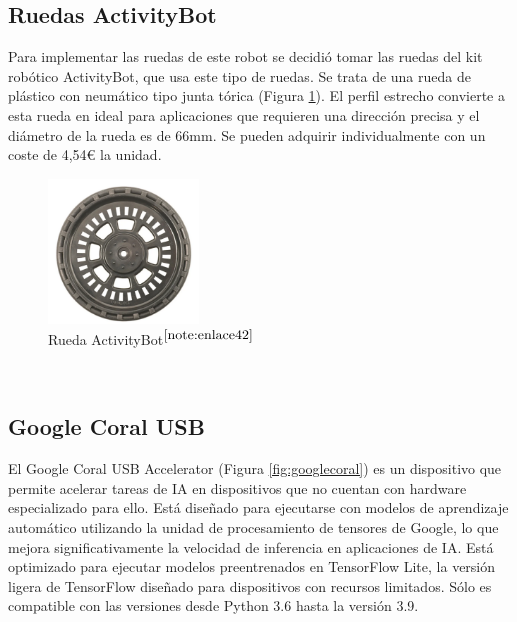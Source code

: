 \setcounter{footnote}{41} %



\subsection{Ruedas ActivityBot}

Para implementar las ruedas de este robot se decidió tomar las ruedas del kit robótico ActivityBot, que usa este tipo de ruedas. Se trata de una rueda de plástico con neumático tipo junta tórica (Figura \ref{fig:wheel}). El perfil estrecho convierte a esta rueda en ideal para aplicaciones que requieren una dirección precisa y el diámetro de la rueda es de 66mm. Se pueden adquirir individualmente con un coste de 4,54€ la unidad.

\begin{figure} [h!]
	\begin{center}
		\includegraphics[width=4cm]{figs/wheel.png}
	\end{center}
	\caption{Rueda ActivityBot$^{\ref{note:enlace42}}$} 
\label{fig:wheel}
\end{figure}\

\setcounter{footnote}{42} %

\subsection{Google Coral USB}

El Google Coral USB Accelerator (Figura \ref{fig:googlecoral}) es un dispositivo que permite acelerar tareas de \ac{IA} en dispositivos que no cuentan con hardware especializado para ello. Está diseñado para ejecutarse con modelos de aprendizaje automático utilizando la unidad de procesamiento de tensores de Google, lo que mejora significativamente la velocidad de inferencia en aplicaciones de \acs{IA}. Está optimizado para ejecutar modelos preentrenados en TensorFlow Lite, la versión ligera de TensorFlow diseñado para dispositivos con recursos limitados. Sólo es compatible con  las versiones desde Python 3.6 hasta la versión 3.9.

